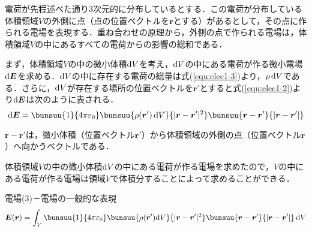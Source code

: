 電荷が先程述べた通り3次元的に分布しているとする．この電荷が分布している体積領域$V$の外側に点（点の位置ベクトルを$\bm{r}$とする）があるとして，その点に作られる電場を表現する．重ね合わせの原理から，外側の点で作られる電場は，体積領域$V$の中にあるすべての電荷からの影響の総和である．

まず，体積領域$V$の中の微小体積$\mathrm{d} V$を考え，$\mathrm{d} V$の中にある電荷が作る微小電場$\mathrm{d}\bm{E}$を求める．$\mathrm{d} V$の中に存在する電荷の総量は式(\ref{equ:elec1-3})より，$\rho\,\mathrm{d} V$である．さらに，$\mathrm{d} V$が存在する場所の位置ベクトルを$\bm{r}'$とすると式(\ref{equ:elec1-2})より$\mathrm{d}\bm{E}$は次のように表される．
\begin{equation}
	\md\bm{E} = \bunsuu{1}{4\pi\varepsilon_0}\bunsuu{\rho(\bm{r}')\,\md V}{|\bm{r} - \bm{r}'|^2}\bunsuu{\bm{r} - \bm{r}'}{|\bm{r} - \bm{r}'|}
\end{equation}

$\bm{r} - \bm{r}'$は，微小体積（位置ベクトル$\bm{r}'$）から体積領域の外側の点（位置ベクトル$\bm{r}$）へ向かうベクトルである．

体積領域$V$の中の微小体積$\mathrm{d} V$の中にある電荷が作る電場を求めたので，$V$の中にある電荷が作る電場は領域$V$で体積分することによって求めることができる．

\begin{kousiki}{電場(3)－電場の一般的な表現}
	\begin{equation}
		\bm{E}(\bm{r}) = \int_{V} \bunsuu{1}{4\pi\varepsilon_0}\bunsuu{\rho(\bm{r}')\md V}{|\bm{r} - \bm{r}'|^2}\bunsuu{\bm{r} - \bm{r}'}{|\bm{r} - \bm{r}'|}\,\md V
	\end{equation}
\end{kousiki}